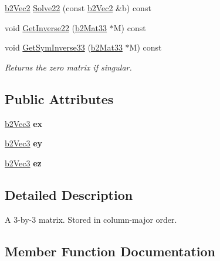 \begin{DoxyCompactItemize}
\item 
\mbox{\hyperlink{structb2Vec2}{b2\+Vec2}} \mbox{\hyperlink{structb2Mat33_acdf892aab7e26283f8aa600ade91dcef}{Solve22}} (const \mbox{\hyperlink{structb2Vec2}{b2\+Vec2}} \&b) const
\item 
void \mbox{\hyperlink{structb2Mat33_aa020bfd08e28c4cecda303ba335fe517}{Get\+Inverse22}} (\mbox{\hyperlink{structb2Mat33}{b2\+Mat33}} $\ast$M) const
\item 
void \mbox{\hyperlink{structb2Mat33_a2620944663233096d3b82bc4b1a991e9}{Get\+Sym\+Inverse33}} (\mbox{\hyperlink{structb2Mat33}{b2\+Mat33}} $\ast$M) const
\begin{DoxyCompactList}\small\item\em Returns the zero matrix if singular. \end{DoxyCompactList}\end{DoxyCompactItemize}
\subsection*{Public Attributes}
\begin{DoxyCompactItemize}
\item 
\mbox{\label{structb2Mat33_a132f00e6550d1e19c75fb60ce1229638}} 
\mbox{\hyperlink{structb2Vec3}{b2\+Vec3}} {\bfseries ex}
\item 
\mbox{\label{structb2Mat33_ababc69c718c73a04a651f7a6a981ecf4}} 
\mbox{\hyperlink{structb2Vec3}{b2\+Vec3}} {\bfseries ey}
\item 
\mbox{\label{structb2Mat33_ae700fc46f679b4ef211a2517005b0557}} 
\mbox{\hyperlink{structb2Vec3}{b2\+Vec3}} {\bfseries ez}
\end{DoxyCompactItemize}


\subsection{Detailed Description}
A 3-\/by-\/3 matrix. Stored in column-\/major order. 

\subsection{Member Function Documentation}
\mbox{\label{structb2Mat33_aa020bfd08e28c4cecda303ba335fe517}} 
